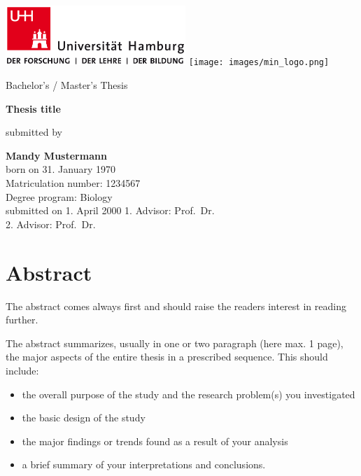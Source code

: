 \documentclass[a4paper,12pt]{article}
\providecommand{\tightlist}{%
  \setlength{\itemsep}{0pt}\setlength{\parskip}{0pt}}
\begin{document}
\thispagestyle{empty}
\begin{titlepage}

\includegraphics[width=6.8cm]{images/uhh_logo.png}
\hspace{2cm}
\texttt{[image: images/min\_logo.png]}
\begin{center}\Large
  \vfill
	Bachelor's / Master's Thesis
	\vfill
	\makeatletter
	{\LARGE\textsf{\textbf{Thesis title}}\par}
	\makeatother
	\vfill
  submitted by \\\vspace{0.5cm}
  \par\bigskip
	\makeatletter
  \textbf{Mandy Mustermann} \\
  \makeatother
  born on 31. January 1970 \\
  Matriculation number: 1234567 \\
  Degree program: Biology \\
  \vfill
	\makeatletter
	submitted on 1. April 2000
	\makeatother
	\vfill
  1. Advisor: Prof.~Dr. \\
  2. Advisor: Prof.~Dr. \\

\end{center}
\end{titlepage}

\newpage
\hypertarget{abstract}{%
\section*{Abstract}\label{abstract}}

The abstract comes always first and should raise the readers interest in reading further.

The abstract summarizes, usually in one or two paragraph (here max. 1 page), the major aspects of the entire thesis in a prescribed sequence. This should include:
\begin{itemize}
\tightlist
\item
  the overall purpose of the study and the research problem(s) you investigated
\item
  the basic design of the study
\item
  the major findings or trends found as a result of your analysis
\item
  a brief summary of your interpretations and conclusions.
\end{itemize}
\pagestyle{plain}
\setcounter{page}{1}    %
\end{document}
